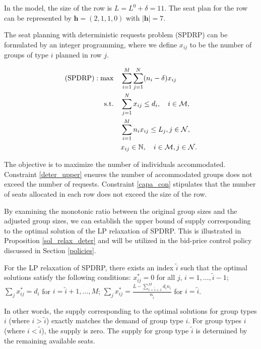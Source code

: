 In the model, the size of the row is $L = L^{0} + \delta =11$. The seat plan for the row can be represented by $\bm{h} = (2,1,1,0)$ with $|\bm{h}| = 7$.

The seat planning with deterministic requests problem (SPDRP) can be formulated by an integer programming, where we define $x_{ij}$ to be the number of groups of type $i$ planned in row $j$. 

\begin{align}
(\textup{SPDRP}): \max \quad & \sum_{i=1}^{M}  \sum_{j= 1}^{N} (n_i- \delta) x_{ij} \notag \\
\text {s.t.} \quad & \sum_{j= 1}^{N} x_{ij} \leq d_{i}, \quad i \in \mathcal{M}, \label{deter_upper}\\ 
& \sum_{i=1}^{M} n_{i} x_{ij} \leq L_j, j \in \mathcal{N}, \label{capa_con} \\
& x_{ij} \in \mathbb{N}, \quad i \in \mathcal{M}, j \in \mathcal{N}. \notag 
\end{align}

The objective is to maximize the number of individuals accommodated. Constraint \eqref{deter_upper} ensures the number of accommodated groups does not exceed the number of requests. Constraint \eqref{capa_con} stipulates that the number of seats allocated in each row does not exceed the size of the row.

By examining the monotonic ratio between the original group sizes and the adjusted group sizes, we can establish the upper bound of supply corresponding to the optimal solution of the LP relaxation of SPDRP. This is illustrated in Proposition \ref{sol_relax_deter} and will be utilized in the bid-price control policy discussed in Section \ref{policies}.

\begin{prop}\label{sol_relax_deter}
For the LP relaxation of \textup{SPDRP}, there exists an index $\tilde{i}$ such that the optimal solutions satisfy the following conditions: $x_{ij}^{*} = 0$ for all $j$, $i = 1,\ldots, \tilde{i}-1$; $\sum_{j} x_{ij}^{*} = d_{i}$ for $i = \tilde{i}+1,\ldots, M$; $\sum_{j} x_{ij}^{*} = \frac{L - \sum_{i = \tilde{i}+1}^{M} {d_i n_i}}{n_{\tilde{i}}}$ for $i = \tilde{i}$.
\end{prop}

In other words, the supply corresponding to the optimal solutions for group types $i$ (where $i > \tilde{i}$) exactly matches the demand of group type $i$. For group types $i$ (where $i < \tilde{i}$), the supply is zero. The supply for group type $\tilde{i}$ is determined by the remaining available seats.

